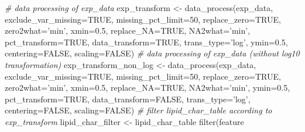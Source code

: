 \documentclass[]{article}
\newcommand{\hlnum}[1]{\textcolor[rgb]{0.816,0.125,0.439}{#1}}%
\newcommand{\hlstr}[1]{\textcolor[rgb]{0.251,0.627,0.251}{#1}}%
\newcommand{\hlcom}[1]{\textcolor[rgb]{0.502,0.502,0.502}{\textit{#1}}}%
\newcommand{\hlopt}[1]{\textcolor[rgb]{0,0,0}{#1}}%
\newcommand{\hlstd}[1]{\textcolor[rgb]{0.251,0.251,0.251}{#1}}%
\newcommand{\hlkwc}[1]{\textcolor[rgb]{0.251,0.251,0.251}{#1}}%
\newcommand{\hlkwd}[1]{\textcolor[rgb]{0.878,0.439,0.125}{#1}}%
\newenvironment{Shaded}{\begin{myshaded}}{\end{myshaded}}
\newcommand{\KeywordTok}[1]{\hlkwd{#1}}
\newcommand{\DataTypeTok}[1]{\hlkwc{#1}}
\newcommand{\DecValTok}[1]{\hlnum{#1}}
\newcommand{\FloatTok}[1]{\hlnum{#1}}
\newcommand{\StringTok}[1]{\hlstr{#1}}
\newcommand{\CommentTok}[1]{\hlcom{#1}}
\newcommand{\OtherTok}[1]{{#1}}
\newcommand{\OperatorTok}[1]{\hlopt{#1}}
\newcommand{\NormalTok}[1]{\hlstd{#1}}
\begin{document}
\begin{Shaded}
\begin{Highlighting}[]
\CommentTok{# data processing of exp_data}
\NormalTok{exp_transform <-}\StringTok{ }\KeywordTok{data_process}\NormalTok{(exp_data, }\DataTypeTok{exclude_var_missing=}\OtherTok{TRUE}\NormalTok{,}
                              \DataTypeTok{missing_pct_limit=}\DecValTok{50}\NormalTok{,}
                              \DataTypeTok{replace_zero=}\OtherTok{TRUE}\NormalTok{, }\DataTypeTok{zero2what=}\StringTok{'min'}\NormalTok{,}
                              \DataTypeTok{xmin=}\FloatTok{0.5}\NormalTok{, }\DataTypeTok{replace_NA=}\OtherTok{TRUE}\NormalTok{,}
                              \DataTypeTok{NA2what=}\StringTok{'min'}\NormalTok{, }\DataTypeTok{pct_transform=}\OtherTok{TRUE}\NormalTok{,}
                              \DataTypeTok{data_transform=}\OtherTok{TRUE}\NormalTok{, }\DataTypeTok{trans_type=}\StringTok{'log'}\NormalTok{,}
                              \DataTypeTok{ymin=}\FloatTok{0.5}\NormalTok{, }\DataTypeTok{centering=}\OtherTok{FALSE}\NormalTok{, }\DataTypeTok{scaling=}\OtherTok{FALSE}\NormalTok{)}
\CommentTok{# data processing of exp_data (without log10 transformation)}
\NormalTok{exp_transform_non_log <-}\StringTok{ }\KeywordTok{data_process}\NormalTok{(exp_data, }\DataTypeTok{exclude_var_missing=}\OtherTok{TRUE}\NormalTok{,}
                                      \DataTypeTok{missing_pct_limit=}\DecValTok{50}\NormalTok{,}
                                      \DataTypeTok{replace_zero=}\OtherTok{TRUE}\NormalTok{,}
                                      \DataTypeTok{zero2what=}\StringTok{'min'}\NormalTok{, }\DataTypeTok{xmin=}\FloatTok{0.5}\NormalTok{,}
                                      \DataTypeTok{replace_NA=}\OtherTok{TRUE}\NormalTok{, }\DataTypeTok{NA2what=}\StringTok{'min'}\NormalTok{,}
                                      \DataTypeTok{ymin=}\FloatTok{0.5}\NormalTok{, }\DataTypeTok{pct_transform=}\OtherTok{TRUE}\NormalTok{,}
                                      \DataTypeTok{data_transform=}\OtherTok{FALSE}\NormalTok{,}
                                      \DataTypeTok{trans_type=}\StringTok{'log'}\NormalTok{,}
                                      \DataTypeTok{centering=}\OtherTok{FALSE}\NormalTok{, }\DataTypeTok{scaling=}\OtherTok{FALSE}\NormalTok{)}
\CommentTok{# filter lipid_char_table according to exp_transform}
\NormalTok{lipid_char_filter <-}\StringTok{ }\NormalTok{lipid_char_table }\OperatorTok{%
\StringTok{  }\KeywordTok{filter}\NormalTok{(feature }\OperatorTok{%
}}
\end{Highlighting}
\end{Shaded}
\end{document}
